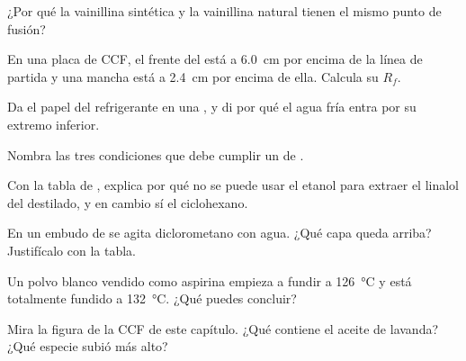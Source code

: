 \begin{exercise}[$\star$]\label{exo:g10:chemical-species:2}
¿Por qué la vainillina sintética y la vainillina natural tienen el mismo
punto de fusión?
\end{exercise}

\begin{exercise}[$\star$]\label{exo:g10:chemical-species:3}
En una placa de CCF, el frente del  está a \qty{6.0}{cm} por
encima de la línea de partida y una mancha está a \qty{2.4}{cm} por
encima de ella. Calcula su $R_f$.
\end{exercise}

\begin{exercise}[$\star$]\label{exo:g10:chemical-species:4}
Da el papel del refrigerante en una , y di por qué el agua
fría entra por su extremo inferior.
\end{exercise}

\begin{exercise}[$\star$]\label{exo:g10:chemical-species:5}
Nombra las tres condiciones que debe cumplir un  de
.
\end{exercise}

\begin{exercise}[$\star\star$]\label{exo:g10:chemical-species:6}
Con la tabla de , explica por qué no se puede usar el etanol
para extraer el linalol del destilado, y en cambio sí el ciclohexano.
\end{exercise}

\begin{exercise}[$\star\star$]\label{exo:g10:chemical-species:7}
En un embudo de  se agita diclorometano con agua. ¿Qué capa
queda arriba? Justifícalo con la tabla.
\end{exercise}

\begin{exercise}[$\star\star$]\label{exo:g10:chemical-species:8}
Un polvo blanco vendido como aspirina empieza a fundir a
\qty{126}{\celsius} y está totalmente fundido a \qty{132}{\celsius}.
¿Qué puedes concluir?
\end{exercise}

\begin{exercise}[$\star\star$]\label{exo:g10:chemical-species:9}
Mira la figura de la CCF de este capítulo. ¿Qué contiene el aceite de
lavanda? ¿Qué especie subió más alto?
\end{exercise}

